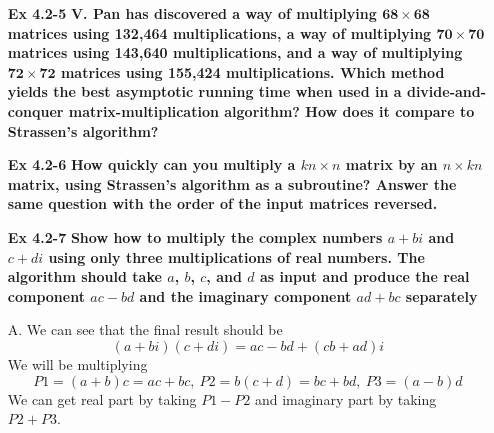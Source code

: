 \documentclass[fontsize=12pt,paper=a4,open=any]{book}
\begin{document}
\begin{enumerate}
	\item[\textbf{Ex 4.2-5}]
		\textbf{V. Pan has discovered a way of multiplying $\mathbf{68 \times 68}$ matrices using 132,464 multiplications, a way of multiplying $\mathbf{70 \times 70}$ matrices using 143,640 multiplications, and a way of multiplying $\mathbf{72 \times 72}$ matrices using 155,424 multiplications. Which method yields the best asymptotic running time when used in a divide-and-conquer matrix-multiplication algorithm? How does it compare to Strassen’s algorithm?}	
	
	\item[\textbf{Ex 4.2-6}]
		\textbf{How quickly can you multiply a $k n \times n$ matrix by an $n \times k n$ matrix, using Strassen’s algorithm as a subroutine? Answer the same question with the order of the input matrices reversed.}
		
	\item[\textbf{Ex 4.2-7}]
		\textbf{Show how to multiply the complex numbers $a + bi$ and $c + di$ using only three multiplications of real numbers. The algorithm should take $a$, $b$, $c$, and $d$ as input and produce the real component $ac - bd$ and the imaginary component $ad + bc$ separately}
	\item[A.]
	We can see that the final result should be
	\[ (a+bi) (c+di) = ac-bd+(cb + ad)i \]
	We will be multiplying \\
	\[ P1 = (a+b)c = ac + bc,\ P2 = b(c+d) = bc + bd,\ P3 = (a-b)d \]
	We can get real part by taking $P1-P2$ and imaginary part by taking $P2+P3$.
\end{enumerate}
\end{document}
